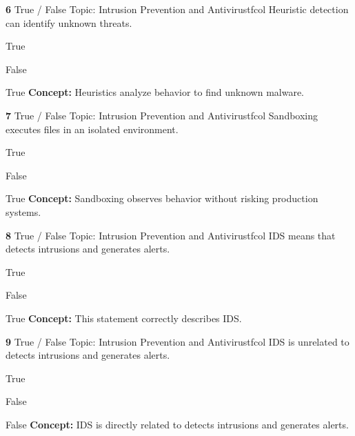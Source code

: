 \documentclass[10pt,a4paper]{article}
\begin{document}
\begin{qcard}{\color{white}\textbf{6} \hfill \small True / False \textbar{} Topic: Intrusion Prevention and Antivirus}{tfcol}
Heuristic detection can identify unknown threats.

\begin{qoptions}
\item True
\item False
\end{qoptions}
\begin{explainbox}{True}
\textbf{Concept:} Heuristics analyze behavior to find unknown malware.
\end{explainbox}
\end{qcard}

\begin{qcard}{\color{white}\textbf{7} \hfill \small True / False \textbar{} Topic: Intrusion Prevention and Antivirus}{tfcol}
Sandboxing executes files in an isolated environment.

\begin{qoptions}
\item True
\item False
\end{qoptions}
\begin{explainbox}{True}
\textbf{Concept:} Sandboxing observes behavior without risking production systems.
\end{explainbox}
\end{qcard}

\begin{qcard}{\color{white}\textbf{8} \hfill \small True / False \textbar{} Topic: Intrusion Prevention and Antivirus}{tfcol}
IDS means that detects intrusions and generates alerts.

\begin{qoptions}
\item True
\item False
\end{qoptions}
\begin{explainbox}{True}
\textbf{Concept:} This statement correctly describes IDS.
\end{explainbox}
\end{qcard}

\begin{qcard}{\color{white}\textbf{9} \hfill \small True / False \textbar{} Topic: Intrusion Prevention and Antivirus}{tfcol}
IDS is unrelated to detects intrusions and generates alerts.

\begin{qoptions}
\item True
\item False
\end{qoptions}
\begin{explainbox}{False}
\textbf{Concept:} IDS is directly related to detects intrusions and generates alerts.
\end{explainbox}
\end{qcard}
\end{document}
